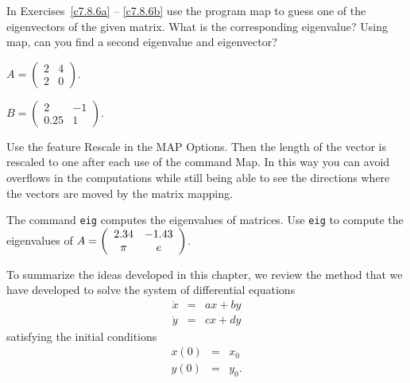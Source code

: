 \noindent In Exercises~\ref{c7.8.6a} -- \ref{c7.8.6b} use the program
{\sf map} to guess one of the eigenvectors of the given matrix.  What is
the corresponding eigenvalue?  Using {\sf map}, can you find a second
eigenvalue and eigenvector?
\begin{exercise} \label{c7.8.6a}
$A=\left(\begin{array}{rr} 2 & 4\\ 2 & 0
\end{array}\right)$.
\end{exercise}
\begin{exercise} \label{c7.8.6b}
$B=\left(\begin{array}{rr} 2 & -1\\ 0.25 & 1
\end{array}\right)$.

 Use the feature {\sf Rescale} in the
{\sf MAP Options}.  Then the length of the vector is rescaled to one
after each use of the command {\sf Map}. In this way you can avoid
overflows in the computations while still being able to see the
directions where the vectors are moved by the matrix mapping.
\end{exercise}

\begin{exercise} \label{c7.8.7}
The \Matlab command {\tt eig} computes the eigenvalues
of matrices.  Use {\tt eig} to compute the eigenvalues of 
$A = \left(\begin{array}{cc} 2.34 & -1.43\\ \pi &e\end{array}\right)$.
\end{exercise}



\label{S:IVPR}

To summarize the ideas developed in this chapter, we review the method
that we have developed to solve the system of differential equations
\begin{equation} \label{E:2dode}
\begin{array}{rcl}
\dot{x} & = & ax+by \\
\dot{y} & = & cx+dy
\end{array}
\end{equation}
satisfying the initial conditions
\begin{equation} \label{E:2dic}
\begin{array}{rcl}
   x(0) & = & x_0 \\
   y(0) & = & y_0.
\end{array}
\end{equation}

